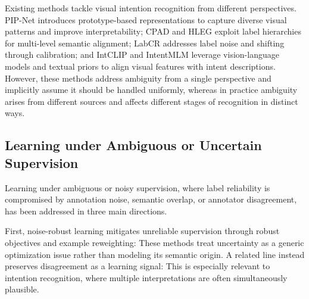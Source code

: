 Existing methods tackle visual intention recognition from different perspectives. PIP-Net \cite{wang_prototype-based_2023} introduces prototype-based representations to capture diverse visual patterns and improve interpretability; CPAD \cite{ye_cross-modality_2023} and HLEG \cite{shi_learnable_2023} exploit label hierarchies for multi-level semantic alignment; LabCR \cite{shi_label-aware_2024} addresses label noise and shifting through calibration; and IntCLIP \cite{leonardis_synergy_2025} and IntentMLM \cite{wang_unlocking_2026} leverage vision-language models and textual priors to align visual features with intent descriptions. However, these methods address ambiguity from a single perspective and implicitly assume it should be handled uniformly, whereas in practice ambiguity arises from different sources and affects different stages of recognition in distinct ways.

\subsection{Learning under Ambiguous or Uncertain Supervision}

Learning under ambiguous or noisy supervision, where label reliability is compromised by annotation noise, semantic overlap, or annotator disagreement, has been addressed in three main directions.

First, noise-robust learning mitigates unreliable supervision through robust objectives and example reweighting:  These methods treat uncertainty as a generic optimization issue rather than modeling its semantic origin. A related line instead preserves disagreement as a learning signal:  This is especially relevant to intention recognition, where multiple interpretations are often simultaneously plausible.

